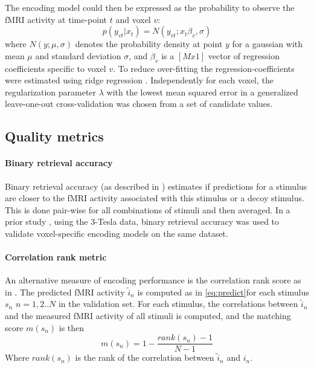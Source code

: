 The encoding model could then be expressed as the probability to observe the f{MRI} activity at time-point $t$ and voxel $v$:
\begin{equation}\label{eq:encmo} p(y_{vt}|x_{t}) = N(y_{vt};x_{t}\beta_{v},\sigma) \end{equation} where
$N(y;\mu,\sigma)$ denotes the probability density at point $y$ for a gaussian
with mean $\mu$ and standard deviation $\sigma$, and $\beta_{v}$ is a $[Mx1]$
vector of regression coefficients specific to voxel $v$. To reduce over-fitting
the regression-coefficients were estimated using ridge regression \cite{HK70}.
Independently for each voxel, the regularization parameter $\lambda$ with the
lowest mean squared error in a generalized leave-one-out cross-validation
\cite{GHW79} was chosen from a set of candidate values.

\subsection*{Quality metrics} 

\paragraph{Binary retrieval accuracy}

Binary retrieval accuracy (as described in \cite{ML08}) estimates if predictions
for a stimulus are closer to the f{MRI} activity associated with this stimulus
or a decoy stimulus. This is done pair-wise for all combinations of stimuli and
then averaged.
In a prior study \cite{CTK+2012}, using the 3-Tesla data, binary retrieval accuracy was used to validate voxel-specific encoding models on the same dataset.

\paragraph{Correlation rank metric}
An alternative measure of encoding performance is the correlation rank score as in \cite{SF14}. The predicted f{MRI} activity $\widetilde{i}_{n}$ is computed as in \ref{eq:predict}for each stimulus $s_{n}$ $n=1,2..N$  in the validation set.
For each stimulus, the correlations between $\widetilde{i}_{n}$ and the measured f{MRI} activity of all stimuli is computed, and the matching score $m(s_{n})$ is then
\[ m(s_{n}) = 1-\frac{rank(s_{n})-1}{N-1} \]
Where $rank(s_{n})$ is the rank of the correlation between $\widetilde{i}_{n}$ and $i_{n}$.

